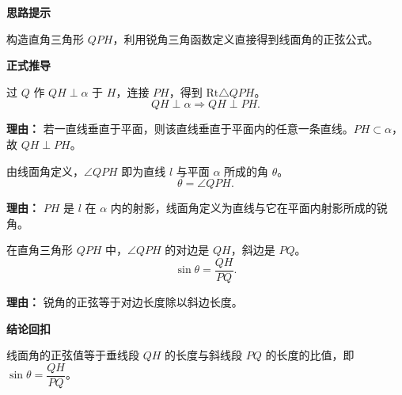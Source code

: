 \begin{proofbox}

	\textbf{\textcolor{CProof}{思路提示}}

	构造直角三角形 $QPH$，利用锐角三角函数定义直接得到线面角的正弦公式。

	\medskip
	\textbf{\textcolor{CProof}{正式推导}}
	\begin{description}[style=nextline, leftmargin=2.8em, labelsep=0.5em, itemsep=0.55em]
		\item[\textbf{步骤一（作垂线）：}]
			过 $Q$ 作 $QH \perp \alpha$ 于 $H$，连接 $PH$，得到 $\mathrm{Rt}\triangle QPH$。
			\[
				QH \perp \alpha \Rightarrow QH \perp PH.
			\]
			\par\textbf{理由：}
			若一直线垂直于平面，则该直线垂直于平面内的任意一条直线。$PH \subset \alpha$，故 $QH \perp PH$。

		\item[\textbf{步骤二（确定线面角）：}]
			由线面角定义，$\angle QPH$ 即为直线 $l$ 与平面 $\alpha$ 所成的角 $\theta$。
			\[
				\theta = \angle QPH.
			\]
			\par\textbf{理由：}
			$PH$ 是 $l$ 在 $\alpha$ 内的射影，线面角定义为直线与它在平面内射影所成的锐角。

		\item[\textbf{步骤三（正弦公式）：}]
			在直角三角形 $QPH$ 中，$\angle QPH$ 的对边是 $QH$，斜边是 $PQ$。
			\[
				\sin\theta = \frac{QH}{PQ}.
			\]
			\par\textbf{理由：}
			锐角的正弦等于对边长度除以斜边长度。
	\end{description}

	\medskip
	\textbf{\textcolor{CProof}{结论回扣}}

	线面角的正弦值等于垂线段 $QH$ 的长度与斜线段 $PQ$ 的长度的比值，即 $\sin\theta = \dfrac{QH}{PQ}$。
\end{proofbox}
